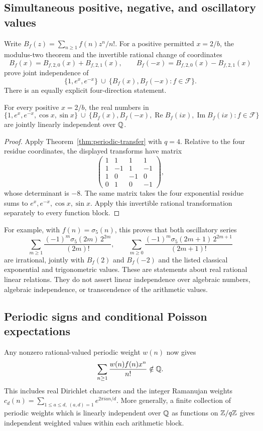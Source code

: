 \subsection{Simultaneous positive, negative, and oscillatory values}
Write $B_f(z)=\sum_{n\geq1}f(n)z^n/n!$.
For a positive permitted $x=2/b$, the modulus-two theorem and the
invertible rational change of coordinates
\[
 B_f(x)=B_{f,2,0}(x)+B_{f,2,1}(x),\qquad
 B_f(-x)=B_{f,2,0}(x)-B_{f,2,1}(x)
\]
prove joint independence of
\[
 \{1,e^x,e^{-x}\}\ \cup\ \{B_f(x),B_f(-x):f\in\mathcal F\}.
\]
There is an equally explicit four-direction statement.

\begin{corollary}\label{cor:four-directions}
For every positive $x=2/b$, the real numbers in
\[
 \{1,e^x,e^{-x},\cos x,\sin x\}
 \ \cup\
 \{B_f(x),B_f(-x),\operatorname{Re}B_f(ix),
                         \operatorname{Im}B_f(ix):f\in\mathcal F\}
\]
are jointly linearly independent over $\mathbb Q$.
\end{corollary}
\begin{proof}
Apply Theorem~\ref{thm:periodic-transfer} with $q=4$. Relative to the
four residue coordinates, the displayed transforms have matrix
\[
 \begin{pmatrix}
 1&1&1&1\\
 1&-1&1&-1\\
 1&0&-1&0\\
 0&1&0&-1
 \end{pmatrix},
\]
whose determinant is $-8$. The same matrix takes the four exponential
residue sums to $e^x,e^{-x},\cos x,\sin x$. Apply this invertible
rational transformation separately to every function block.
\end{proof}
For example, with $f(n)=\sigma_5(n)$, this proves that both oscillatory
series
\[
 \sum_{m\geq1}\frac{(-1)^m\sigma_5(2m)\,2^{2m}}{(2m)!},
 \qquad
 \sum_{m\geq0}\frac{(-1)^m\sigma_5(2m+1)\,2^{2m+1}}{(2m+1)!}
\]
are irrational, jointly with $B_f(2)$ and $B_f(-2)$ and the listed
classical exponential and trigonometric values. These are statements
about real rational linear relations. They do not assert linear
independence over algebraic numbers, algebraic independence, or
transcendence of the arithmetic values.

\subsection{Periodic signs and conditional Poisson expectations}
Any nonzero rational-valued periodic weight $w(n)$ now gives
\[
 \sum_{n\geq1}\frac{w(n)f(n)x^n}{n!}\notin\mathbb Q.
\]
This includes real Dirichlet characters and the integer Ramanujan
weights $c_d(n)=\sum_{1\leq a\leq d,\ (a,d)=1}e^{2\pi ian/d}$.
More generally, a finite collection of periodic weights which is
linearly independent over $\mathbb Q$ as functions on $\mathbb Z/q\mathbb Z$ gives
independent weighted values within each arithmetic block.

